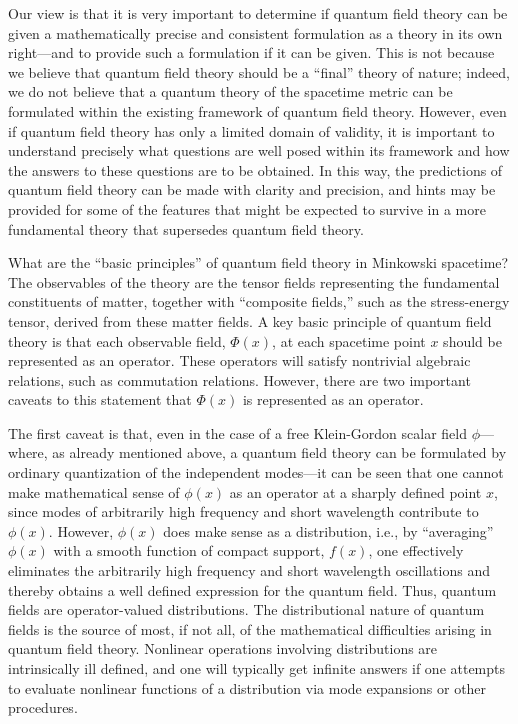 \documentclass[12pt]{article}
\renewcommand{\O}{\Phi}
\theoremstyle{plain}
\theoremstyle{definition}
\begin{document}
Our view is that it is very important to determine if quantum field theory can be given a mathematically precise and consistent formulation as a theory in its own right---and to provide such a formulation if it can be given. This is not because we believe that quantum field theory should be a ``final'' theory of nature; indeed, we do not believe that a quantum theory of the spacetime metric can be formulated within the existing framework of quantum field theory. However, even if quantum field theory has only a limited domain of validity, it is important to understand precisely what questions are well posed within its framework and how the answers to these questions are to be obtained. In this way, the predictions of quantum field theory can be made with clarity and precision, and hints may be provided for some of the features that might be expected to survive in a more fundamental theory that supersedes quantum field theory.

What are the ``basic principles'' of quantum field theory in Minkowski spacetime? The observables of the theory are the tensor fields representing the fundamental constituents of matter, together with ``composite fields,'' such as the stress-energy tensor, derived from these matter fields. A key basic principle of quantum field theory is that each observable field, $\O(x)$, at each spacetime point $x$ should be represented as an operator. These operators will satisfy nontrivial algebraic relations, such as commutation relations. However, there are two important caveats to this statement that $\O(x)$ is represented as an operator.

The first caveat is that, even in the case of a free Klein-Gordon scalar field $\phi$---where, as already mentioned above, a quantum field theory can be formulated by ordinary quantization of the independent modes---it can be seen that one cannot make mathematical sense of $\phi(x)$ as an operator at a sharply defined point $x$, since modes of arbitrarily high frequency and short wavelength contribute to $\phi(x)$. However, $\phi(x)$ does make sense as a distribution, i.e., by ``averaging'' $\phi(x)$ with a smooth function of compact support, $f(x)$, one effectively eliminates the arbitrarily high frequency and short wavelength oscillations and thereby obtains a well defined expression for the quantum field. Thus, quantum fields are operator-valued distributions. The distributional nature of quantum fields is the source of most, if not all, of the mathematical difficulties arising in quantum field theory. Nonlinear operations involving distributions are intrinsically ill defined, and one will typically
get infinite answers if one attempts to evaluate nonlinear functions of a distribution via mode expansions or other procedures.
\end{document}
